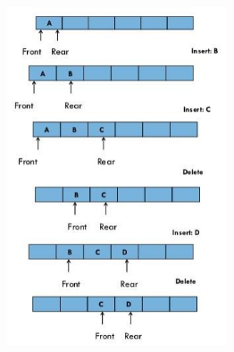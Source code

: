 \documentclass[11pt]{article}            %
\begin{document}
\begin{figure}[H]
\centering
  \includegraphics[width=12cm,height=10cm,keepaspectratio]{1.png}
\caption{}
\label{}    
\end{figure}
\end{document}
